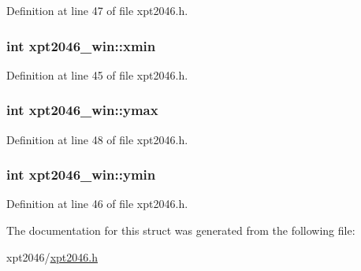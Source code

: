 Definition at line 47 of file xpt2046.\+h.

\subsubsection[{\texorpdfstring{xmin}{xmin}}]{\setlength{\rightskip}{0pt plus 5cm}int xpt2046\+\_\+win\+::xmin}\hypertarget{structxpt2046__win_a83246592b12a936f334cea8f3374eafc}{}\label{structxpt2046__win_a83246592b12a936f334cea8f3374eafc}


Definition at line 45 of file xpt2046.\+h.

\subsubsection[{\texorpdfstring{ymax}{ymax}}]{\setlength{\rightskip}{0pt plus 5cm}int xpt2046\+\_\+win\+::ymax}\hypertarget{structxpt2046__win_ad5cfee0de6f30ce141b93b0aec904376}{}\label{structxpt2046__win_ad5cfee0de6f30ce141b93b0aec904376}


Definition at line 48 of file xpt2046.\+h.

\subsubsection[{\texorpdfstring{ymin}{ymin}}]{\setlength{\rightskip}{0pt plus 5cm}int xpt2046\+\_\+win\+::ymin}\hypertarget{structxpt2046__win_a8a6c2bee978d86317e06b8bb41a65d7c}{}\label{structxpt2046__win_a8a6c2bee978d86317e06b8bb41a65d7c}


Definition at line 46 of file xpt2046.\+h.



The documentation for this struct was generated from the following file\+:\begin{DoxyCompactItemize}
\item 
xpt2046/\hyperlink{xpt2046_8h}{xpt2046.\+h}\end{DoxyCompactItemize}
